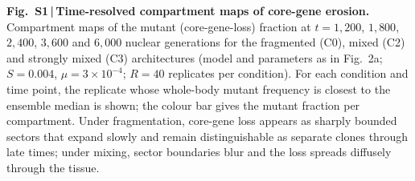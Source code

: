 
\noindent\textbf{Fig.~S1\,|\,Time-resolved compartment maps of
core-gene erosion.} Compartment maps of the mutant (core-gene-loss)
fraction at $t=1{,}200$, $1{,}800$, $2{,}400$, $3{,}600$ and $6{,}000$
nuclear generations for the fragmented (C0), mixed (C2) and strongly
mixed (C3) architectures (model and parameters as in Fig.~2a;
$S=0.004$, $\mu=3\times10^{-4}$; $R=40$ replicates per condition).
For each condition and time point, the replicate whose whole-body
mutant frequency is closest to the ensemble median is shown; the colour
bar gives the mutant fraction per compartment. Under fragmentation,
core-gene loss appears as sharply bounded sectors that expand slowly
and remain distinguishable as separate clones through late times; under
mixing, sector boundaries blur and the loss spreads diffusely through
the tissue.